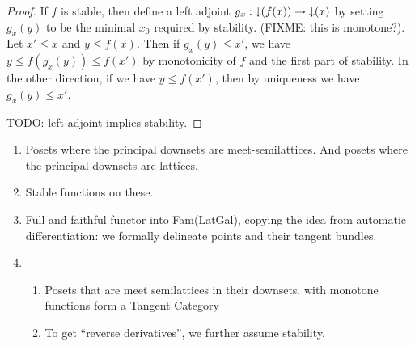 \begin{proof}
  If $f$ is stable, then define a left adjoint
  $g_x : \mathop{\downarrow}(f(x)) \to \mathop{\downarrow}(x)$ by setting $g_x(y)$ to be the
  minimal $x_0$ required by stability. (FIXME: this is monotone?). Let
  $x' \leq x$ and $y \leq f(x)$. Then if $g_x(y) \leq x'$, we have
  $y \leq f(g_x(y)) \leq f(x')$ by monotonicity of $f$ and the first
  part of stability. In the other direction, if we have
  $y \leq f(x')$, then by uniqueness we have $g_x(y) \leq x'$.

  TODO: left adjoint implies stability.
\end{proof}



\begin{enumerate}
\item Posets where the principal downsets are meet-semilattices. And
  posets where the principal downsets are lattices.
\item Stable functions on these.
\item Full and faithful functor into Fam(LatGal), copying the idea
  from automatic differentiation: we formally delineate points and
  their tangent bundles.
\item
  \begin{enumerate}
  \item Posets that are meet semilattices in their downsets, with
    monotone functions form a Tangent Category
  \item To get ``reverse derivatives'', we further assume stability.
  \end{enumerate}
\end{enumerate}
